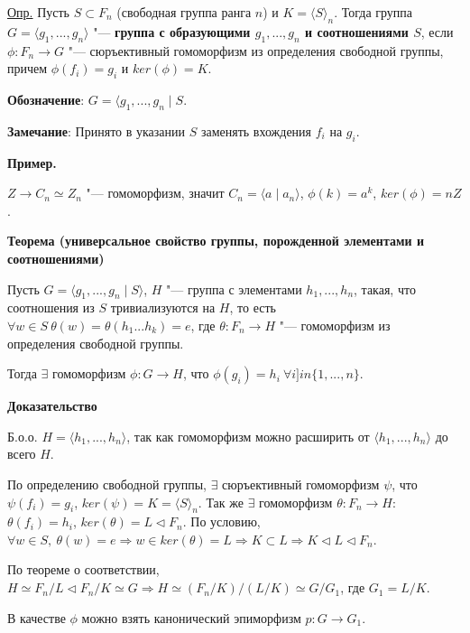 \documentclass{article}
\begin{document}
\vspace{10pt}

\underline{Опр.} Пусть $S \subset F_n$ (свободная группа ранга $n$) и $K = \langle S \rangle_n$. Тогда группа $G = \langle g_1, ..., g_n \rangle$ "--- \textbf{группа с образующими $g_1, ..., g_n$ и соотношениями $S$}, если $\phi: F_n \rightarrow G$ "--- сюръективный гомоморфизм из определения свободной группы, причем $\phi(f_i) = g_i$ и $ker(\phi) = K$.

\textbf{Обозначение}: $G = \langle g_1, ..., g_n \mid S$.

\textbf{Замечание}: Принято в указании $S$ заменять вхождения $f_i$ на $g_i$.

\textbf{Пример.}

$Z \rightarrow C_n \simeq Z_n$ "--- гомоморфизм, значит $C_n = \langle a \mid a_n \rangle$, $\phi(k) = a^k$, $ker(\phi) = nZ$.

\vspace{10pt}

\textbf{Теорема (универсальное свойство группы, порожденной элементами и соотношениями)}

Пусть $G = \langle g_1 ,..., g_n \mid S \rangle$, $H$ "--- группа с элементами $h_1, ..., h_n$, такая, что соотношения из $S$ тривиализуются на $H$, то есть $\forall w \in S \  \theta(w) = \theta(h_1...h_k) = e$, где $\theta: F_n \rightarrow H$ "--- гомоморфизм из определения свободной группы.

Тогда $\exists$ гомоморфизм $\phi: G \rightarrow H$, что $\phi(g_i) = h_i \  \forall i ]in \{1, ..., n\}$.

\textbf{Доказательство}

Б.о.о. $H = \langle h_1, ..., h_n \rangle$, так как гомоморфизм можно расширить от $\langle h_1, ..., h_n \rangle$ до всего $H$.

По определению свободной группы, $\exists$ сюръективный гомоморфизм $\psi$, что $\psi(f_i) = g_i$, $ker(\psi) = K = \langle S \rangle_n$. Так же $\exists$ гомоморфизм $\theta: F_n \rightarrow H$: $\theta(f_i) = h_i$, $ker(\theta) = L \triangleleft F_n$. По условию, $\forall w \in S, \  \theta(w) = e \Rightarrow w \in ker(\theta) = L \Rightarrow  K \subset L \Rightarrow K \triangleleft L \triangleleft F_n$.

По теореме о соответствии, $H \simeq F_n/L \triangleleft F_n/K \simeq G \Rightarrow H \simeq (F_n/K)/(L/K) \simeq G/G_1$, где $G_1 = L/K$.

В качестве $\phi$ можно взять канонический эпиморфизм $p: G \rightarrow G_1$.
\end{document}
